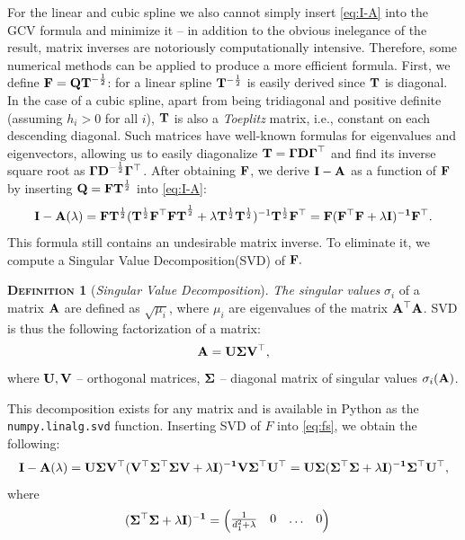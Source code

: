 \documentclass[11pt,leqno]{book}
\theoremstyle{definition}
\theoremstyle{plain}
\theoremstyle{definition}
\newtheorem{definition}[theorem]{\scshape{Definition}}
\begin{document}
{For the linear and cubic spline we also cannot simply insert \eqref{eq:I-A} into the GCV formula and minimize it -- in addition to the obvious inelegance of the result, matrix inverses are notoriously computationally intensive. Therefore, some numerical methods can be applied to produce a more efficient formula. First, we define $\vb{F}=\vb{QT}^{-\frac{1}{2}}$: for a linear spline $\vb{T}^{-\frac{1}{2}}$ is easily derived since $\vb{T}$ is diagonal.  In the case of a cubic spline, apart from being tridiagonal and positive definite (assuming ${h}_i>0$ for all $i$), $\vb{T}$ is also a \textit{Toeplitz} matrix, i.e., constant on each descending diagonal. Such matrices have well-known formulas for eigenvalues and eigenvectors, allowing us to easily diagonalize $\vb{T}=\vb{\Gamma D\Gamma}^\top $ and find its inverse square root as $\vb{\Gamma D}^{-\frac{1}{2}}\vb{\Gamma}^\top $. After obtaining $\vb{F}$, we derive $\vb{I}-\vb{A}$ as a function of $\vb{F}$ by inserting $\vb{Q}=\vb{FT}^{\frac{1}{2}}$ into \eqref{eq:I-A}:
\begin{equation}
\vb{I}-\vb{A}(\lambda)=\vb{FT}^{\frac{1}{2}}(\vb{T}^{\frac{1}{2}}\vb{F^\top FT}^{\frac{1}{2}}+\lambda \vb{T}^{\frac{1}{2}}\vb{T}^{\frac{1}{2}})^{-1}\vb{T}^{\frac{1}{2}}\vb{F}^\top =\vb{F(F^\top F+\lambda I)^{-1}F^\top}.
\label{eq:fs}
\end{equation}
This formula still contains an undesirable matrix inverse. To eliminate it, we compute a Singular Value Decomposition(SVD) of $\vb{F}.$
\begin{definition}[\textit{Singular Value Decomposition}]
    \textit{The singular values} $\sigma_i$ of a matrix $\vb{A}$ are defined as $\sqrt{\mu_i}$, where $\mu_i$ are eigenvalues of the matrix $\vb{A^\top A}$. SVD is thus the following factorization of a matrix:
\[
\vb{A=U\Sigma V^\top} ,
\]
where $\vb{U, V}$ -- orthogonal matrices, $\vb{\Sigma}$ -- diagonal matrix of singular values $\sigma_i(\vb{A})$.
\end{definition}
\noindent This decomposition exists for any matrix and is available in Python as the \texttt{numpy.linalg.svd} function. Inserting SVD of $F$ into \eqref{eq:fs}, we obtain the following:
\[\vb{
I-A(\lambda)=U\Sigma V^\top (V^\top \Sigma^\top \Sigma V+\lambda I)^{-1}V\Sigma^\top U^\top =U\Sigma(\Sigma^\top \Sigma+\lambda I)^{-1}\Sigma^\top U^\top},
\]
where
\begin{equation*}
\begin{aligned}
&\vb{(\Sigma^\top\Sigma+\lambda I)^{-1}}=
\begin{pmatrix}
\frac{1}{d_1^2+\lambda}&0& \ldots & 0 \\

\end{pmatrix}
\end{aligned}
\end{equation*}}
\end{document}
